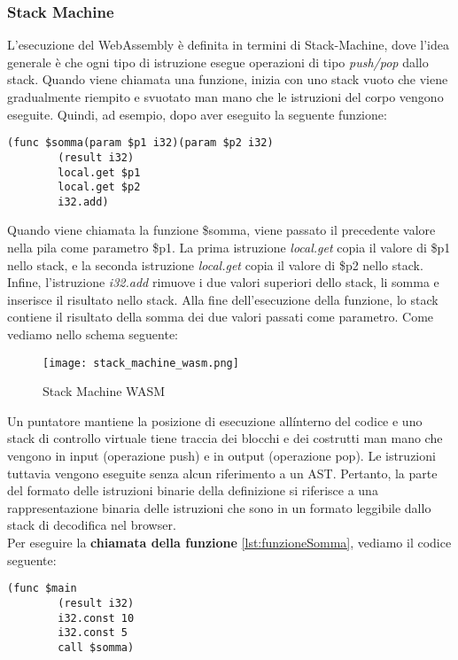 \documentclass[../../main.tex]{subfiles}
\begin{document}
\subsubsection{Stack Machine}
L'esecuzione del WebAssembly è definita in termini di Stack-Machine, dove l'idea generale è che ogni tipo di istruzione esegue operazioni di tipo \textit{push/pop} dallo stack.
Quando viene chiamata una funzione, inizia con uno stack vuoto che viene gradualmente riempito e svuotato man mano che le istruzioni del corpo vengono eseguite. Quindi, ad esempio, dopo aver eseguito la seguente funzione:
\begin{lstlisting}[language=WebAssembly, label={lst:funzioneSomma}]
    (func $somma(param $p1 i32)(param $p2 i32)
        (result i32)
        local.get $p1
        local.get $p2
        i32.add)
\end{lstlisting}
Quando viene chiamata la funzione \$somma, viene passato il precedente valore nella pila come parametro \$p1. La prima istruzione \textit{local.get} copia il valore di \$p1 nello stack, e la seconda istruzione \textit{local.get} copia il valore di \$p2 nello stack. Infine, l'istruzione \textit{i32.add} rimuove i due valori superiori dello stack, li somma e inserisce il risultato nello stack. Alla fine dell'esecuzione della funzione, lo stack contiene il risultato della somma dei due valori passati come parametro.
Come vediamo nello schema seguente:
\begin{figure}[H]
    \centering
    \texttt{[image: stack\_machine\_wasm.png]}
    \caption{Stack Machine WASM}
    \label{fig:stack_machine}
\end{figure}
Un puntatore mantiene la posizione di esecuzione all\' interno del codice e uno stack di controllo virtuale tiene traccia dei blocchi e dei costrutti man mano che vengono in input (operazione push) e in output (operazione pop). Le istruzioni tuttavia vengono eseguite senza alcun riferimento a un AST. Pertanto, la parte del formato delle istruzioni binarie della definizione si riferisce a una rappresentazione binaria delle istruzioni che sono in un formato leggibile dallo stack di decodifica nel browser.\autocite{amslaurea20464}\\
Per eseguire la \textbf{chiamata della funzione} \ref{lst:funzioneSomma}, vediamo il codice seguente:
\begin{lstlisting}[language=WebAssembly]
    (func $main
        (result i32)
        i32.const 10
        i32.const 5
        call $somma)
\end{lstlisting}
\end{document}
